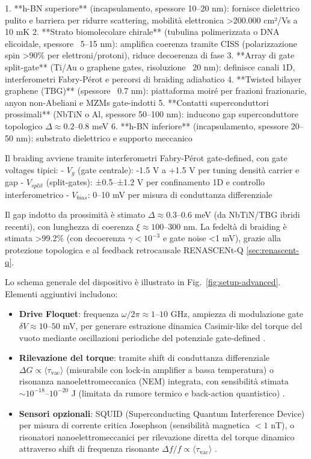 \documentclass[11pt,a4paper]{article}
\let\oldcite\cite
\renewcommand{\cite}{\protect\oldcite}
\let\oldref\ref
\renewcommand{\ref}{\protect\oldref}
\theoremstyle{plain}
\theoremstyle{definition}
\begin{document}
1. **h-BN superiore** (incapsulamento, spessore 10–20 nm): fornisce dielettrico pulito e barriera per ridurre scattering, mobilità elettronica >200.000 cm²/Vs a 10 mK
2. **Strato biomolecolare chirale** (tubulina polimerizzata o DNA elicoidale, spessore ~5–15 nm): amplifica coerenza tramite CISS (polarizzazione spin >90\% per elettroni/protoni), riduce decoerenza di fase
3. **Array di gate split-gate** (Ti/Au o graphene gates, risoluzione ~20 nm): definisce canali 1D, interferometri Fabry-Pérot e percorsi di braiding adiabatico
4. **Twisted bilayer graphene (TBG)** (spessore ~0.7 nm): piattaforma moiré per frazioni frazionarie, anyon non-Abeliani e MZMs gate-indotti
5. **Contatti superconduttori prossimali** (NbTiN o Al, spessore 50–100 nm): inducono gap superconduttore topologico $\Delta \approx 0.2$–$0.8$ meV
6. **h-BN inferiore** (incapsulamento, spessore 20–50 nm): substrato dielettrico e supporto meccanico

Il braiding avviene tramite interferometri Fabry-Pérot gate-defined, con gate voltages tipici:
- $V_g$ (gate centrale): -1.5 V a +1.5 V per tuning densità carrier e gap
- $V_{split}$ (split-gates): ±0.5–±1.2 V per confinamento 1D e controllo interferometrico
- $V_{bias}$: 0–10 mV per misura di conduttanza differenziale

Il gap indotto da prossimità è stimato $\Delta \approx 0.3$–$0.6$ meV (da NbTiN/TBG ibridi recenti), con lunghezza di coerenza $\xi \approx 100$–$300$ nm. La fedeltà di braiding è stimata >99.2\% (con decoerenza $\gamma < 10^{-3}$ e gate noise <1 mV), grazie alla protezione topologica e al feedback retrocausale RENASCENt-Q \eqref{sec:renascent-q}.

Lo schema generale del dispositivo è illustrato in Fig.~\ref{fig:setup-advanced}. Elementi aggiuntivi includono:

\begin{itemize}
    \item \textbf{Drive Floquet}: frequenza $\omega/2\pi \approx 1$--$10$ GHz, ampiezza di modulazione gate $\delta V \approx 10$--$50$ mV, per generare estrazione dinamica Casimir-like del torque del vuoto mediante oscillazioni periodiche del potenziale gate-defined \cite{wilson2011observation,moore2015dynamic}.
    
    \item \textbf{Rilevazione del torque}: tramite shift di conduttanza differenziale $\Delta G \propto \langle \tau_{\text{vac}} \rangle$ (misurabile con lock-in amplifier a bassa temperatura) o risonanza nanoelettromeccanica (NEM) integrata, con sensibilità stimata $\sim 10^{-18}$--$10^{-20}$ J (limitata da rumore termico e back-action quantistico) \cite{regal2008measurement,castellanos-gomez2012nanomechanical}.
    
    \item \textbf{Sensori opzionali}: SQUID (Superconducting Quantum Interference Device) per misura di corrente critica Josephson (sensibilità magnetica $<1$ nT), o risonatori nanoelettromeccanici per rilevazione diretta del torque dinamico attraverso shift di frequenza risonante $\Delta f / f \propto \langle \tau_{\text{vac}} \rangle$ \cite{cleland2002nanomechanical}.
\end{itemize}
\end{document}
